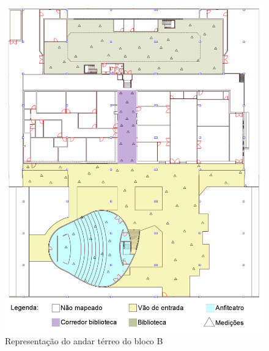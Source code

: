 \begin{figure}[H]
  \centering
  \begin{minipage}[b]{1\textwidth}
    \includegraphics[width=\textwidth]{imagens/1andar.png}
    \caption{Representação do andar térreo do bloco B}
  \end{minipage}
  
\end{figure}

